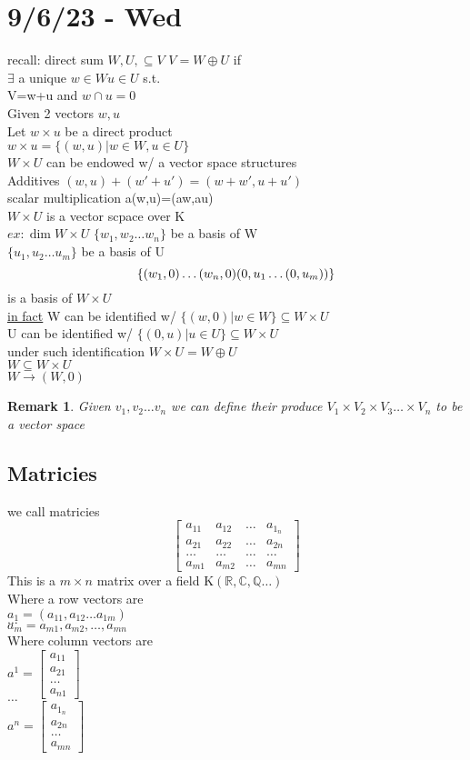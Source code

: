 \documentclass{article}
\newtheorem*{remark}{Remark}
\newcommand{\R}{\mathbb{R}}
\newcommand{\Q}{\mathbb{Q}}
\newcommand{\C}{\mathbb{C}}
\newcommand\m[1]{\begin{bmatrix}#1\end{bmatrix}}
\newcommand{\vs}{v_1,v_2\dots v_n}
\newcommand{\ws}{w_1,w_2\dots w_n}
\newcommand{\brac}[1]{\{#1\}}
\newcommand{\op}{\oplus}
\begin{document}
\section{9/6/23 - Wed}
recall: direct sum $W, U, \subseteq V$
$V=W\op U$ if\\
$\exists $ a unique $w\in W u \in U$ s.t.\\
V=w+u and $w\cap u=0$\\
Given 2 vectors $w,u$\\
Let $w \times u$ be a direct product\\
$w \times u =\brac{(w,u)|w\in W,u \in U}$
\\$W \times U$ can be endowed w/ a vector space structures\\
Additives $(w,u)+(w'+u')=(w+w',u+u')$
\\scalar multiplication a(w,u)=(aw,au)\\
$W \times U$ is a vector scpace over K\\
$ex: \dim W\times U$
$\brac{\ws}$ be a basis of W
\\$\brac{u_1,u_2\dots u_m}$ be a basis of U
\\$$\brac{(w_1,0)\dots (w_n,0)\newline (0,u_1\dots(0,u_m))}$$ is a basis of $W \times U$\\
\underline{in fact} W can be identified w/ $\brac{(w,0)|w\in W} \subseteq W\times U$
\\U can be identified w/ $\brac{(0,u)|u \in U}\subseteq W\times U$\\
under  such identification $W \times U = W \op U$\\
$W \subseteq W \times U$
\\$W \to (W,0)$
\begin{remark}
    Given $\vs$ we can define their produce $V_1 \times V_2 \times V_3 \dots \times V_n$ to be a vector space
\end{remark}
\subsection{Matricies}
we call matricies $$\m{a_{11}&a_{12}&\dots &a_{1_n}\\a_{21}&a_{22}&\dots &a_{2n}\\ \dots &\dots&\dots&\dots\\a_{m1}&a_{m2}&\dots& a_{mn}}$$
This is a $m\times n$ matrix over a field K$(\R,\C,\Q\dots)$\\
Where a row vectors are \\$a_1=(a_{11},a_{12}\dots a_{1m})$\\$\dots$\\$a_m={a_{m1},a_{m2},\dots,a_{mn}}$
\\Where column vectors are \\
$a^1=\m{a_{11}\\a_{21}\\\dots\\a_{n1}}$
\\$\dots$\\
$a^n=\m{a_{1_n}\\a_{2n}\\\dots\\a_{mn}}$
\end{document}
